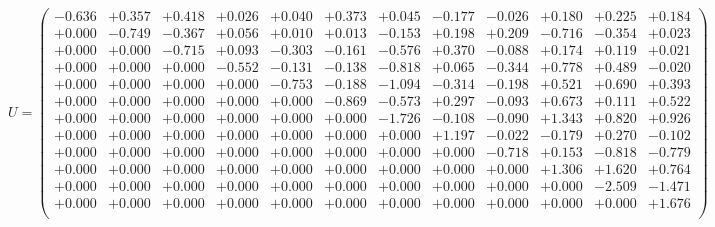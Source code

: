 \documentclass[9pt]{article}
\theoremstyle{plain}
\theoremstyle{definition}
\theoremstyle{remark}
\numberwithin{equation}{section}
\begin{document}
$U = \left(
\begin{array}{
cccccccccccc}
-0.636 & +0.357 & +0.418 & +0.026 & +0.040 & +0.373 & +0.045 & -0.177 & -0.026 & +0.180 & +0.225 & +0.184 \\
+0.000 & -0.749 & -0.367 & +0.056 & +0.010 & +0.013 & -0.153 & +0.198 & +0.209 & -0.716 & -0.354 & +0.023 \\
+0.000 & +0.000 & -0.715 & +0.093 & -0.303 & -0.161 & -0.576 & +0.370 & -0.088 & +0.174 & +0.119 & +0.021 \\
+0.000 & +0.000 & +0.000 & -0.552 & -0.131 & -0.138 & -0.818 & +0.065 & -0.344 & +0.778 & +0.489 & -0.020 \\
+0.000 & +0.000 & +0.000 & +0.000 & -0.753 & -0.188 & -1.094 & -0.314 & -0.198 & +0.521 & +0.690 & +0.393 \\
+0.000 & +0.000 & +0.000 & +0.000 & +0.000 & -0.869 & -0.573 & +0.297 & -0.093 & +0.673 & +0.111 & +0.522 \\
+0.000 & +0.000 & +0.000 & +0.000 & +0.000 & +0.000 & -1.726 & -0.108 & -0.090 & +1.343 & +0.820 & +0.926 \\
+0.000 & +0.000 & +0.000 & +0.000 & +0.000 & +0.000 & +0.000 & +1.197 & -0.022 & -0.179 & +0.270 & -0.102 \\
+0.000 & +0.000 & +0.000 & +0.000 & +0.000 & +0.000 & +0.000 & +0.000 & -0.718 & +0.153 & -0.818 & -0.779 \\
+0.000 & +0.000 & +0.000 & +0.000 & +0.000 & +0.000 & +0.000 & +0.000 & +0.000 & +1.306 & +1.620 & +0.764 \\
+0.000 & +0.000 & +0.000 & +0.000 & +0.000 & +0.000 & +0.000 & +0.000 & +0.000 & +0.000 & -2.509 & -1.471 \\
+0.000 & +0.000 & +0.000 & +0.000 & +0.000 & +0.000 & +0.000 & +0.000 & +0.000 & +0.000 & +0.000 & +1.676 \\
\end{array}
\right)$ \newline 
\end{document}
